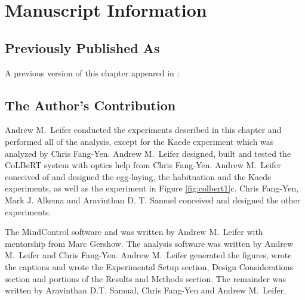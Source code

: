 \section{Manuscript Information}
\subsection{Previously Published As}
A previous version of this chapter appeared in \citep{leifer_optogenetic_2011}:


\subsection{The Author's Contribution}
Andrew M.~Leifer conducted the experiments described in this chapter and performed all of the analysis, except for the Kaede experiment which was analyzed by Chris Fang-Yen. Andrew M.~Leifer designed, built and tested the CoLBeRT system with optics help from Chris Fang-Yen.  Andrew M.~Leifer conceived of and designed the egg-laying, the habituation and the Kaede experiments, as well as the experiment in Figure \ref{fig:colbert1}c.    Chris Fang-Yen, Mark J. Alkema and Aravinthan D. T. Samuel conceived and designed the other experiments. 

The MindControl software and was written by Andrew M.~Leifer with mentorship from Marc Gershow. The analysis software was written by Andrew M.~Leifer and Chris Fang-Yen. Andrew M.~Leifer generated the figures, wrote the captions and wrote the Experimental Setup section, Design Considerations section and  portions of the Results and  Methods section.  The remainder was written by Aravinthan D.T. Samual, Chris Fang-Yen and Andrew M.~Leifer.  